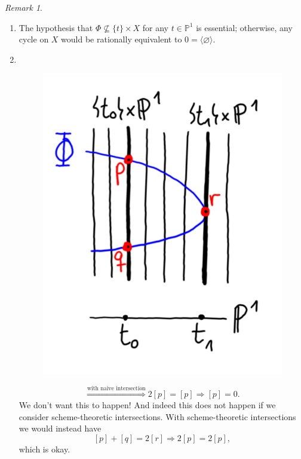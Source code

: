 \documentclass[12pt,a4paper]{amsart}
\theoremstyle{plain}
\theoremstyle{definition}
\theoremstyle{remark}
\newtheorem{rem}[thm]{Remark}
\begin{document}
\begin{rem}\mbox{ }
    \begin{enumerate}
	\item The hypothesis that $\Phi \not\subseteq \{t\}\times X$ for any $t\in \mathbb{P}^{1}$ is essential; otherwise, any cycle on $X$ would be rationally equivalent to $0=\langle \varnothing \rangle$.
	\item \mbox{ }
	    \begin{figure}[H]
		\centering
		\includegraphics[scale=.2]{pictures/twotoone}
	\end{figure}
	    \[ \overset{\text{with naive intersection}}{\Rightarrow} 2[p]=[p]\Rightarrow [p]=0. \]
	    We don't want this to happen!
	    And indeed this does not happen if we consider scheme-theoretic intersections.
	    With scheme-theoretic intersections we would instead have
	    \[ [p]+[q]=2[r]\Rightarrow 2[p]=2[p], \]
	    which is okay.
    \end{enumerate}
\end{rem}
\end{document}
